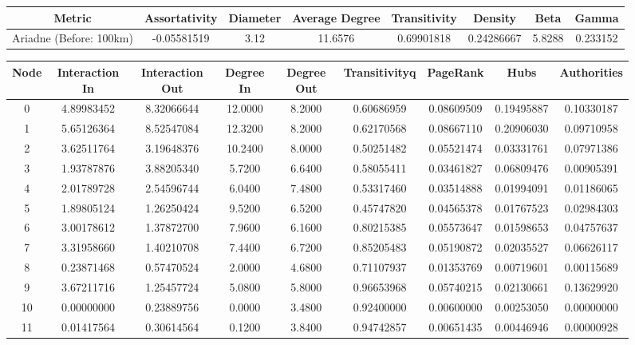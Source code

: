 \documentclass[12pt,a4paper]{thesis}
\begin{document}
\begin{figure}[H]
\centering
\tiny
\begin{tabular}{|c|c|c|c|c|c|c|c|}
\hline Metric & Assortativity & Diameter & Average Degree & Transitivity & Density & Beta & Gamma \\ 
\hline Ariadne (Before: 100km) & -0.05581519 & 3.12 & 11.6576	& 0.69901818 & 0.24286667 & 5.8288 & 0.233152 \\
\hline 
\end{tabular} 
\end{figure}

\begin{figure}[H]
\centering
\tiny
\begin{tabular}{|c|c|c|c|c|c|c|c|c|}
\hline	Node	&	Interaction In	&	Interaction Out	&	Degree In	&	Degree Out	&	Transitivityq	&	PageRank	&	Hubs	&	Authorities	\\
\hline	0	&	4.89983452	&	8.32066644	&	12.0000	&	8.2000	&	0.60686959	&	0.08609509	&	0.19495887	&	0.10330187	\\
\hline	1	&	5.65126364	&	8.52547084	&	12.3200	&	8.2000	&	0.62170568	&	0.08667110	&	0.20906030	&	0.09710958	\\
\hline	2	&	3.62511764	&	3.19648376	&	10.2400	&	8.0000	&	0.50251482	&	0.05521474	&	0.03331761	&	0.07971386	\\
\hline	3	&	1.93787876	&	3.88205340	&	5.7200	&	6.6400	&	0.58055411	&	0.03461827	&	0.06809476	&	0.00905391	\\
\hline	4	&	2.01789728	&	2.54596744	&	6.0400	&	7.4800	&	0.53317460	&	0.03514888	&	0.01994091	&	0.01186065	\\
\hline	5	&	1.89805124	&	1.26250424	&	9.5200	&	6.5200	&	0.45747820	&	0.04565378	&	0.01767523	&	0.02984303	\\
\hline	6	&	3.00178612	&	1.37872700	&	7.9600	&	6.1600	&	0.80215385	&	0.05573647	&	0.01598653	&	0.04757637	\\
\hline	7	&	3.31958660	&	1.40210708	&	7.4400	&	6.7200	&	0.85205483	&	0.05190872	&	0.02035527	&	0.06626117	\\
\hline	8	&	0.23871468	&	0.57470524	&	2.0000	&	4.6800	&	0.71107937	&	0.01353769	&	0.00719601	&	0.00115689	\\
\hline	9	&	3.67211716	&	1.25457724	&	5.0800	&	5.8000	&	0.96653968	&	0.05740215	&	0.02130661	&	0.13629920	\\
\hline	10	&	0.00000000	&	0.23889756	&	0.0000	&	3.4800	&	0.92400000	&	0.00600000	&	0.00253050	&	0.00000000	\\
\hline	11	&	0.01417564	&	0.30614564	&	0.1200	&	3.8400	&	0.94742857	&	0.00651435	&	0.00446946	&	0.00000928	\\

\end{tabular}
\end{figure}
\end{document}
